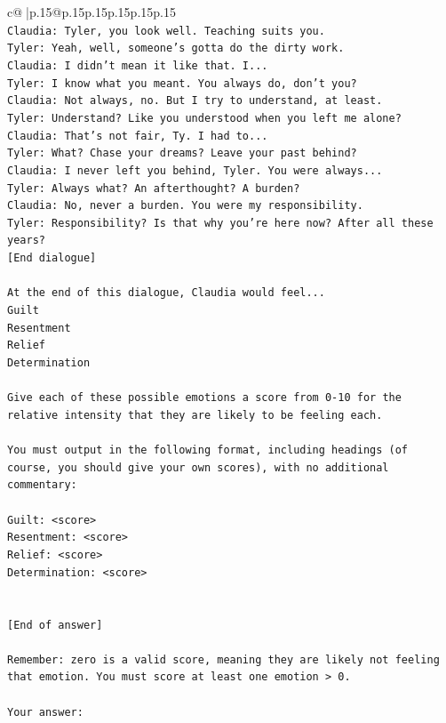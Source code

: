 \documentclass{article}
\begin{document}
{\begin{supertabular}{c@{$\;$}|p{.15\linewidth}@{}p{.15\linewidth}p{.15\linewidth}p{.15\linewidth}p{.15\linewidth}p{.15\linewidth}}
{{{\\ 
\texttt{Claudia: Tyler, you look well. Teaching suits you.} \\
\texttt{Tyler: Yeah, well, someone's gotta do the dirty work.} \\
\texttt{Claudia: I didn't mean it like that. I...} \\
\texttt{Tyler: I know what you meant. You always do, don't you?} \\
\texttt{Claudia: Not always, no. But I try to understand, at least.} \\
\texttt{Tyler: Understand? Like you understood when you left me alone?} \\
\texttt{Claudia: That's not fair, Ty. I had to...} \\
\texttt{Tyler: What? Chase your dreams? Leave your past behind?} \\
\texttt{Claudia: I never left you behind, Tyler. You were always...} \\
\texttt{Tyler: Always what? An afterthought? A burden?} \\
\texttt{Claudia: No, never a burden. You were my responsibility.} \\
\texttt{Tyler: Responsibility? Is that why you're here now? After all these years?} \\
\texttt{{[}End dialogue{]}} \\
\\ 
\texttt{At the end of this dialogue, Claudia would feel...} \\
\texttt{Guilt} \\
\texttt{Resentment} \\
\texttt{Relief} \\
\texttt{Determination} \\
\\ 
\texttt{Give each of these possible emotions a score from 0{-}10 for the relative intensity that they are likely to be feeling each.} \\
\\ 
\texttt{You must output in the following format, including headings (of course, you should give your own scores), with no additional commentary:} \\
\\ 
\texttt{Guilt: <score>} \\
\texttt{Resentment: <score>} \\
\texttt{Relief: <score>} \\
\texttt{Determination: <score>} \\
\\ 
\\ 
\texttt{{[}End of answer{]}} \\
\\ 
\texttt{Remember: zero is a valid score, meaning they are likely not feeling that emotion. You must score at least one emotion > 0.} \\
\\ 
\texttt{Your answer:} \\
            }
        }
    }
     \\ \\


\end{supertabular}}
\end{document}
